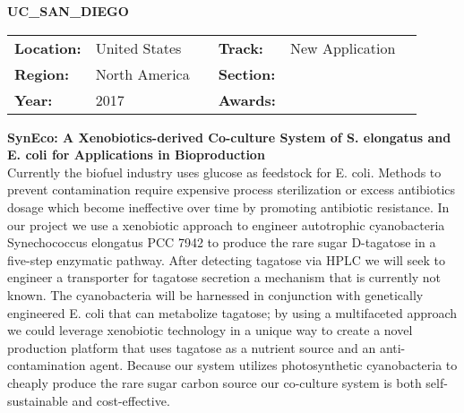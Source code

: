 \textbf{\uppercase{UC\_San\_Diego}} \FloatBarrier \begin{table}[h] \begin{tabular}{lp{2.5cm}llll} \textbf{Location:} & United States & \multicolumn{1}{|l}{} & \textbf{Track:}   & New Application \\ \textbf{Region:}   & North America   & \multicolumn{1}{|l}{} & \textbf{Section:} &  \\ \textbf{Year:}     & 2017   & \multicolumn{1}{|l}{} & \textbf{Awards:}  & \end{tabular} \end{table} \FloatBarrier \noindent\textbf{SynEco: A Xenobiotics-derived Co-culture System of S. elongatus and E. coli for Applications in Bioproduction} \vspace{.2cm}\\ 
Currently the biofuel industry uses glucose as feedstock for E. coli. Methods to prevent contamination require expensive process sterilization or excess antibiotics dosage which become ineffective over time by promoting antibiotic resistance. In our project we use a xenobiotic approach to engineer autotrophic cyanobacteria Synechococcus elongatus PCC 7942 to produce the rare sugar D-tagatose in a five-step enzymatic pathway. After detecting tagatose via HPLC we will seek to engineer a transporter for tagatose secretion a mechanism that is currently not known. The cyanobacteria will be harnessed in conjunction with genetically engineered E. coli that can metabolize tagatose; by using a multifaceted approach we could leverage xenobiotic technology in a unique way to create a novel production platform that uses tagatose as a nutrient source and an anti-contamination agent. Because our system utilizes photosynthetic cyanobacteria to cheaply produce the rare sugar carbon source our co-culture system is both self-sustainable and cost-effective.
\vspace{2cm} $ $
\pagebreak

